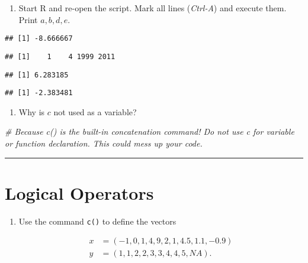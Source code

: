 \documentclass[]{article}
\newenvironment{Shaded}{\begin{snugshade}}{\end{snugshade}}
\newcommand{\CommentTok}[1]{\textcolor[rgb]{0.56,0.35,0.01}{\textit{#1}}}
\providecommand{\tightlist}{%
  \setlength{\itemsep}{0pt}\setlength{\parskip}{0pt}}
\begin{document}
\begin{enumerate}
\def\labelenumi{\arabic{enumi}.}
\setcounter{enumi}{7}
\tightlist
\item
  Start R and re-open the script. Mark all lines (\emph{Ctrl-A}) and
  execute them. Print \(a,b,d,e.\)
\end{enumerate}

\begin{verbatim}
## [1] -8.666667
\end{verbatim}

\begin{verbatim}
## [1]    1    4 1999 2011
\end{verbatim}

\begin{verbatim}
## [1] 6.283185
\end{verbatim}

\begin{verbatim}
## [1] -2.383481
\end{verbatim}

\begin{enumerate}
\def\labelenumi{\arabic{enumi}.}
\setcounter{enumi}{8}
\tightlist
\item
  Why is \(c\) not used as a variable?
\end{enumerate}

\begin{Shaded}
\begin{Highlighting}[]
\CommentTok{# Because c() is the built-in concatenation command! Do not use c for variable or function declaration. This could mess up your code.}
\end{Highlighting}
\end{Shaded}

\begin{center}\rule{0.5\linewidth}{\linethickness}\end{center}

\section{Logical Operators}\label{logical-operators}

\begin{enumerate}
\def\labelenumi{\arabic{enumi}.}
\tightlist
\item
  Use the command \texttt{c()} to define the vectors

  \begin{align*}
  x &=\left( -1,0,1,4,9,2,1,4.5,1.1,-0.9\right) \\
  y &=\left( 1,1,2,2,3,3,4,4,5,NA\right) .
  \end{align*}
\end{enumerate}
\end{document}
